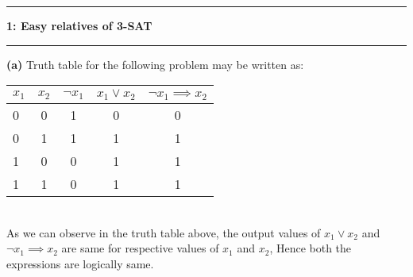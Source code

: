 \documentclass[11pt]{article}
\newcommand\question[2]{\vspace{.25in}\hrule\textbf{#1: #2}\vspace{.5em}\hrule\vspace{.10in}}
\renewcommand\part[1]{\vspace{.10in}\textbf{(#1)}}
\begin{document}
\raggedright
\newcommand\NAME{Aishwarya Asesh}  %
\newcommand\UID{u1063384}     %
\newcommand\HWNUM{3}              %



\question{1}{Easy relatives of 3-SAT}
\part{a}
Truth table for the following problem may be written as:\\
\bgroup 
\def\arraystretch{1.2}
\begin{tabular}{|l|c|c|c|c|} \hline 
{\bf \underline {$x_1$}} & {\bf \underline {$x_2$}} & {\bf \underline {$ \neg x_1$}} & {\bf \underline {$x_{1} \lor x_{2}$}} & {\bf \underline {$\neg x_{1} \implies x_{2}$}} \\ \hline

0 & 0 & 1 & 0 & 0 \\ \hline
0 & 1 & 1 & 1 & 1 \\ \hline
1 & 0 & 0 & 1 & 1 \\ \hline
1 & 1 & 0 & 1 & 1 \\ \hline

\end{tabular}
\egroup
\\As we can observe in the truth table above, the output values of  {$x_{1} \lor x_{2}$} and {$\neg x_{1} \implies x_{2}$} are same for respective values of $x_1$ and $x_2$, Hence both the expressions are logically same.\\
\end{document}
